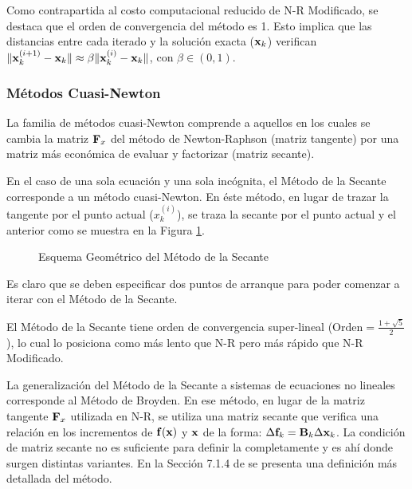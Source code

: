 Como contrapartida al costo computacional reducido de N-R Modificado, se destaca que el orden de convergencia del método es 1. Esto implica que las distancias entre cada iterado y la solución exacta (${\bf x}_k$) verifican $\|{\bf x}_k^{(i+1)}-{\bf x}_k\| \approx \beta \|{\bf x}_k^{(i)}-{\bf x}_k\|$, con $\beta \in (0,1)$.

\subsubsection{Métodos Cuasi-Newton}

La familia de métodos cuasi-Newton comprende a aquellos en los cuales se cambia la matriz ${\bf F}_x$ del método de Newton-Raphson (matriz tangente) por una matriz más económica de evaluar y factorizar (matriz secante).

En el caso de una sola ecuación y una sola incógnita, el Método de la Secante corresponde a un método cuasi-Newton. %
%
En éste método, en lugar de trazar la tangente por el punto actual ($x_k^{(i)}$), se traza la secante por el punto actual y el anterior como se muestra en la Figura \ref{fig:fig3}.
%
\begin{figure}[htb]
	\centering
   \def\svgwidth{0.7\textwidth}

	\caption{Esquema Geométrico del Método de la Secante}
	\label{fig:fig3}
\end{figure}

Es claro que se deben especificar dos puntos de arranque para poder comenzar a iterar con el Método de la Secante.


El Método de la Secante tiene orden de convergencia super-lineal ($\text{Orden}=\frac{1+\sqrt{5}}{2}$), lo cual lo posiciona como más lento que N-R pero más rápido que N-R Modificado.

La generalización del Método de la Secante a sistemas de ecuaciones no lineales corresponde al Método de Broyden. %
%
En ese método, en lugar de la matriz tangente ${\bf F}_x$ utilizada en N-R, se utiliza una matriz secante que verifica una relación en los incrementos de ${\bf f}({\bf x})$ y ${\bf x}$ de la forma: $\Delta {\bf f}_k = {\bf B}_k \Delta {\bf x}_k$. La condición de matriz secante no es suficiente para definir la completamente y es ahí donde surgen distintas variantes. %
%
En la Sección 7.1.4 de \citep{quarteroni2007numeric} se presenta una definición más detallada del método. %

